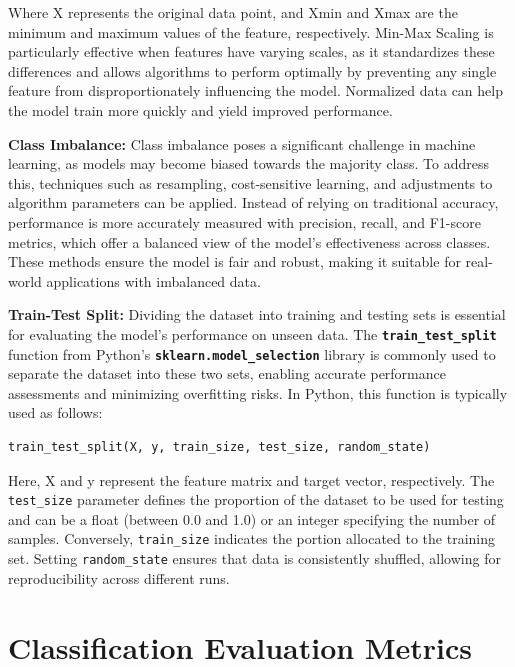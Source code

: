 \documentclass[12pt]{report}
\begin{document}
    Where X represents the original data point, and Xmin and Xmax are the minimum and maximum values of the feature, respectively. Min-Max Scaling is particularly effective when features have varying scales, as it standardizes these differences and allows algorithms to perform optimally by preventing any single feature from disproportionately influencing the model. Normalized data can help the model train more quickly and yield improved performance.

    {\bfseries Class Imbalance:} Class imbalance poses a significant challenge in machine learning, as models may become biased towards the majority class. To address this, techniques such as resampling, cost-sensitive learning, and adjustments to algorithm parameters can be applied. Instead of relying on traditional accuracy, performance is more accurately measured with precision, recall, and F1-score metrics, which offer a balanced view of the model’s effectiveness across classes. These methods ensure the model is fair and robust, making it suitable for real-world applications with imbalanced data.

    {\bfseries Train-Test Split:} Dividing the dataset into training and testing sets is essential for evaluating the model's performance on unseen data. The {\bfseries \texttt{train\_test\_split}} function from Python’s {\bfseries \texttt {sklearn.model\_selection}} library is commonly used to separate the dataset into these two sets, enabling accurate performance assessments and minimizing overfitting risks. In Python, this function is typically used as follows:

    \begin{lstlisting}[style=default, language=python*, gobble=3]
        train_test_split(X, y, train_size, test_size, random_state)
    \end{lstlisting}

    Here, X and y represent the feature matrix and target vector, respectively. The \texttt{test\_size} parameter defines the proportion of the dataset to be used for testing and can be a float (between 0.0 and 1.0) or an integer specifying the number of samples. Conversely, \texttt{train\_size} indicates the portion allocated to the training set. Setting \texttt{random\_state} ensures that data is consistently shuffled, allowing for reproducibility across different runs.

    \section{Classification Evaluation Metrics}
\end{document}
